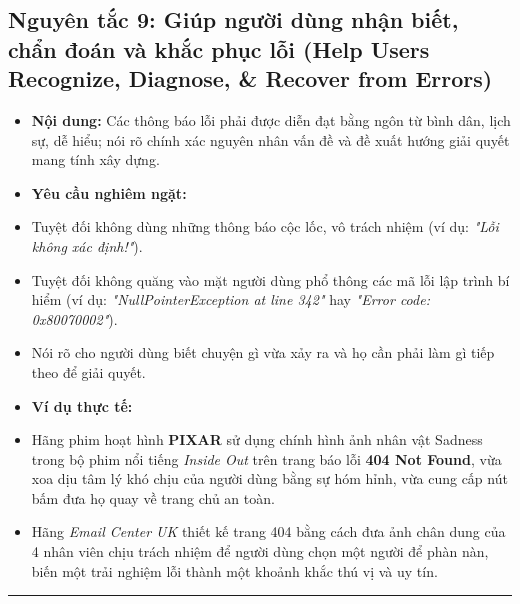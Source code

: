 \documentclass[11pt,a4paper,oneside]{report}
\begin{document}
\subsection{Nguyên tắc 9: Giúp người dùng nhận biết, chẩn đoán và khắc phục lỗi (Help Users Recognize, Diagnose, \& Recover from Errors)}
\begin{itemize}[leftmargin=1.5em]
\item \textbf{Nội dung:} Các thông báo lỗi phải được diễn đạt bằng ngôn từ bình dân, lịch sự, dễ hiểu; nói rõ chính xác nguyên nhân vấn đề và đề xuất hướng giải quyết mang tính xây dựng.
\item \textbf{Yêu cầu nghiêm ngặt:}  
\item Tuyệt đối không dùng những thông báo cộc lốc, vô trách nhiệm (ví dụ: \textit{"Lỗi không xác định!"}).
\item Tuyệt đối không quăng vào mặt người dùng phổ thông các mã lỗi lập trình bí hiểm (ví dụ: \textit{"NullPointerException at line 342"} hay \textit{"Error code: 0x80070002"}).
\item Nói rõ cho người dùng biết chuyện gì vừa xảy ra và họ cần phải làm gì tiếp theo để giải quyết.
\item \textbf{Ví dụ thực tế:}  
\item Hãng phim hoạt hình \textbf{PIXAR} sử dụng chính hình ảnh nhân vật Sadness trong bộ phim nổi tiếng \textit{Inside Out} trên trang báo lỗi \textbf{404 Not Found}, vừa xoa dịu tâm lý khó chịu của người dùng bằng sự hóm hỉnh, vừa cung cấp nút bấm đưa họ quay về trang chủ an toàn.
\item Hãng \textit{Email Center UK} thiết kế trang 404 bằng cách đưa ảnh chân dung của 4 nhân viên chịu trách nhiệm để người dùng chọn một người để phàn nàn, biến một trải nghiệm lỗi thành một khoảnh khắc thú vị và uy tín.
\end{itemize}

\bigskip\hrule\bigskip
\end{document}
